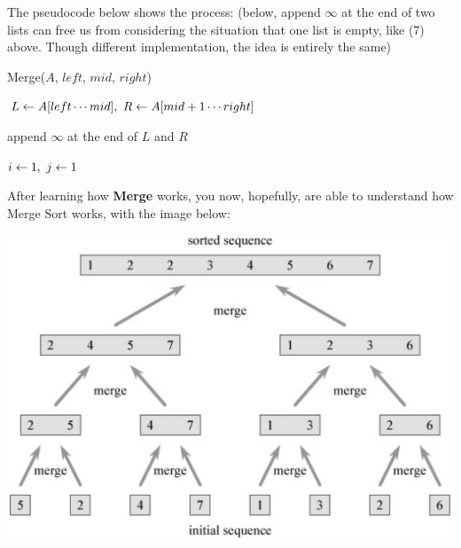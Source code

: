 \begin{spacing}{1.3}
    The pseudocode below shows the process:
    (below, append $\infty$ at the end of two lists can 
    free us from considering the situation that one list is 
    empty, like (7) above. Though different implementation, 
    the idea is entirely the same)
    
    \newpage
    \begin{algorithm}[H]
        \caption{Merge($A$, $left$, $mid$, $right$)}
        $L\leftarrow A[left\cdots mid],\ R\leftarrow A[mid+1\cdots right]$

        append $\infty$ at the end of $L$ and $R$ \qquad {}

        $i\leftarrow 1,\ j\leftarrow 1$\qquad  {}

         {
        }
    \end{algorithm}

    After learning how {\bf Merge} works, you now, hopefully,
    are able to understand how Merge Sort works, with the image below:

    \begin{center}
        \includegraphics[scale=0.17]{images/02-mergeSort.jpeg}
    \end{center}
    

\end{spacing}
